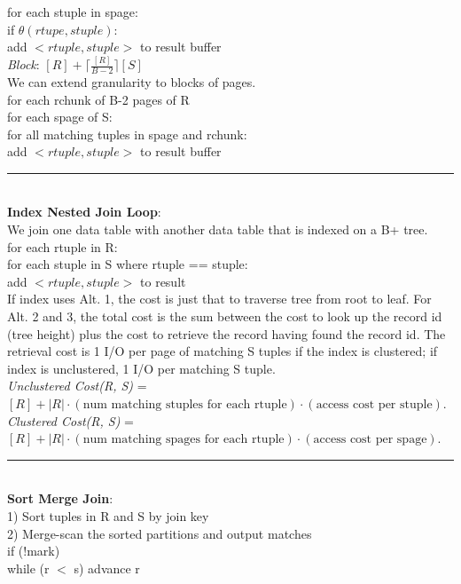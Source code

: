 \documentclass[10pt,landscape]{article}
\newcommand{\ruler}{\\\rule{\columnwidth}{0.25pt}\\}
\begin{document}
\begin{multicols*}{3}
\-\hspace{1.5cm} for each stuple in spage:\\
\-\hspace{2.0cm} if $\theta(rtupe, stuple)$:\\
\-\hspace{2.5cm} add $<rtuple, stuple>$ to result buffer\\
\textit{Block}: $[R] + \lceil\frac{[R]}{B-2}\rceil[S]$\\
We can extend granularity to blocks of pages.\\
for each rchunk of B-2 pages of R\\
\-\hspace{0.5cm} for each spage of S:\\
\-\hspace{1.0cm} for all matching tuples in spage and rchunk:\\
\-\hspace{1.5cm} add $<rtuple, stuple>$ to result buffer
\ruler
\textbf{Index Nested Join Loop}:\\
We join one data table with another data table that is indexed on a B+ tree.\\
for each rtuple in R:\\
\-\hspace{0.5cm} for each stuple in S where rtuple == stuple:\\
\-\hspace{1.0cm} add $<rtuple, stuple>$ to result\\
If index uses Alt. 1, the  cost is just that to traverse tree from root to leaf. For Alt. 2 and 3, the total cost is the sum between the cost to look up the record id (tree height) plus the cost to retrieve the record having found the record id. The retrieval cost is 1 I/O per page of matching S tuples if the index is clustered; if index is unclustered, 1 I/O per matching S tuple. \\
\textit{Unclustered Cost(R, S)} = $[R] + |R| \cdot (\text{num matching stuples for each rtuple}) \cdot (\text{access cost per stuple})$.
\textit{Clustered Cost(R, S)} = $[R] + |R| \cdot (\text{num matching spages for each rtuple}) \cdot (\text{access cost per spage})$.
\ruler
\textbf{Sort Merge Join}:\\
1) Sort tuples in R and S by join key\\
2) Merge-scan the sorted partitions and output matches\\
if (!mark)\\
\-\hspace{0.5cm} while (r $<$ s) advance r \\

\end{multicols*}
\end{document}
